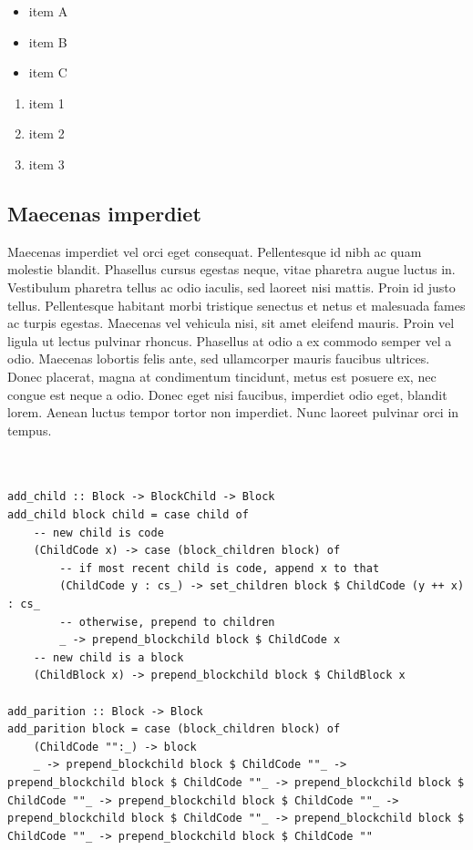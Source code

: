 \documentclass{article}
\begin{document}
\begin{itemize}
\item 
      item A
    
\item  item B
    
\item  item C



\end{itemize}

\begin{enumerate}
\item 
      item 1
    
\item  item 2
    
\item  item 3



\end{enumerate}\subsection{ Maecenas imperdiet }

 Maecenas imperdiet vel orci eget consequat. Pellentesque id nibh ac quam molestie blandit. Phasellus cursus egestas neque, vitae pharetra augue luctus in. Vestibulum pharetra tellus ac odio iaculis, sed laoreet nisi mattis. Proin id justo tellus. Pellentesque habitant morbi tristique senectus et netus et malesuada fames ac turpis egestas. Maecenas vel vehicula nisi, sit amet eleifend mauris. Proin vel ligula ut lectus pulvinar rhoncus. Phasellus at odio a ex commodo semper vel a odio. Maecenas lobortis felis ante, sed ullamcorper mauris faucibus ultrices. Donec placerat, magna at condimentum tincidunt, metus est posuere ex, nec congue est neque a odio. Donec eget nisi faucibus, imperdiet odio eget, blandit lorem. Aenean luctus tempor tortor non imperdiet. Nunc laoreet pulvinar orci in tempus. 



\begin{lstlisting}


add_child :: Block -> BlockChild -> Block
add_child block child = case child of
    -- new child is code
    (ChildCode x) -> case (block_children block) of
        -- if most recent child is code, append x to that
        (ChildCode y : cs_) -> set_children block $ ChildCode (y ++ x) : cs_
        -- otherwise, prepend to children
        _ -> prepend_blockchild block $ ChildCode x
    -- new child is a block
    (ChildBlock x) -> prepend_blockchild block $ ChildBlock x

add_parition :: Block -> Block
add_parition block = case (block_children block) of
    (ChildCode "":_) -> block
    _ -> prepend_blockchild block $ ChildCode ""_ -> prepend_blockchild block $ ChildCode ""_ -> prepend_blockchild block $ ChildCode ""_ -> prepend_blockchild block $ ChildCode ""_ -> prepend_blockchild block $ ChildCode ""_ -> prepend_blockchild block $ ChildCode ""_ -> prepend_blockchild block $ ChildCode ""



\end{lstlisting}
\end{document}

